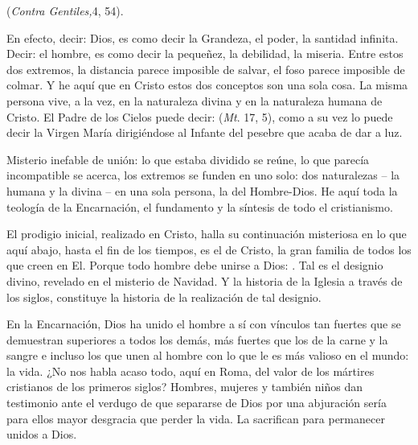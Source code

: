  (\emph{Contra Gentiles,}4, 54).

En efecto, decir: Dios, es como decir la Grandeza, el poder, la santidad infinita. Decir: el hombre, es como decir la pequeñez, la debilidad, la miseria. Entre estos dos extremos, la distancia parece imposible de salvar, el foso parece imposible de colmar. Y he aquí que en Cristo estos dos conceptos son una sola cosa. La misma persona vive, a la vez, en la naturaleza divina y en la naturaleza humana de Cristo. El Padre de los Cielos puede decir:  (\emph{Mt}. 17, 5), como a su vez lo puede decir la Virgen María dirigiéndose al Infante del pesebre que acaba de dar a luz.

Misterio inefable de unión: lo que estaba dividido se reúne, lo que parecía incompatible se acerca, los extremos se funden en uno solo: dos naturalezas -- la humana y la divina -- en una sola persona, la del Hombre-Dios. He aquí toda la teología de la Encarnación, el fundamento y la síntesis de todo el cristianismo.

El prodigio inicial, realizado en Cristo, halla su continuación misteriosa en lo que aquí abajo, hasta el fin de los tiempos, es el  de Cristo, la gran familia de todos los que creen en El. Porque todo hombre debe unirse a Dios: . Tal es el designio divino, revelado en el misterio de Navidad. Y la historia de la Iglesia a través de los siglos, constituye la historia de la realización de tal designio.

En la Encarnación, Dios ha unido el hombre a sí con vínculos tan fuertes que se demuestran superiores a todos los demás, más fuertes que los de la carne y la sangre e incluso los que unen al hombre con lo que le es más valioso en el mundo: la vida. ¿No nos habla acaso todo, aquí en Roma, del valor de los mártires cristianos de los primeros siglos? Hombres, mujeres y también niños dan testimonio ante el verdugo de que separarse de Dios por una abjuración sería para ellos mayor desgracia que perder la vida. La sacrifican para permanecer unidos a Dios.

